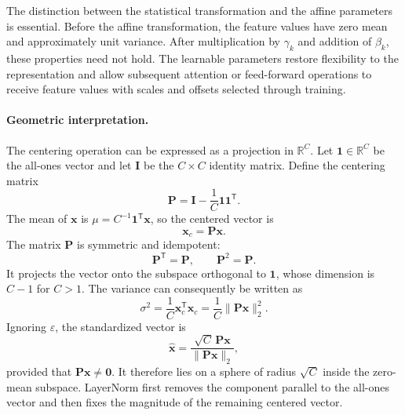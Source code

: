 The distinction between the statistical transformation and the affine
parameters is essential. Before the affine transformation, the feature
values have zero mean and approximately unit variance. After multiplication
by \(\gamma_k\) and addition of \(\beta_k\), these properties need not hold.
The learnable parameters restore flexibility to the representation and allow
subsequent attention or feed-forward operations to receive feature values
with scales and offsets selected through training.

\paragraph{Geometric interpretation.}
The centering operation can be expressed as a projection in
\(\mathbb{R}^{C}\). Let \(\mathbf{1}\in\mathbb{R}^{C}\) be the all-ones
vector and let \(\mathbf{I}\) be the \(C\times C\) identity matrix. Define
the centering matrix
\begin{equation}
    \mathbf{P}
    =
    \mathbf{I}
    -
    \frac{1}{C}\mathbf{1}\mathbf{1}^{\mathsf T}.
    \label{eq:norm-centering-matrix}
\end{equation}
The mean of \(\mathbf{x}\) is
\(\mu=C^{-1}\mathbf{1}^{\mathsf T}\mathbf{x}\), so the centered vector is
\begin{equation}
    \mathbf{x}_{c}
    =
    \mathbf{P}\mathbf{x}.
    \label{eq:norm-projected-vector}
\end{equation}
The matrix \(\mathbf{P}\) is symmetric and idempotent:
\begin{equation}
    \mathbf{P}^{\mathsf T}=\mathbf{P},
    \qquad
    \mathbf{P}^{2}=\mathbf{P}.
    \label{eq:norm-projection-properties}
\end{equation}
It projects the vector onto the subspace orthogonal to \(\mathbf{1}\), whose
dimension is \(C-1\) for \(C>1\). The variance can consequently be written
as
\begin{equation}
    \sigma^2
    =
    \frac{1}{C}\mathbf{x}_{c}^{\mathsf T}\mathbf{x}_{c}
    =
    \frac{1}{C}\|\mathbf{P}\mathbf{x}\|_2^2.
    \label{eq:norm-variance-norm}
\end{equation}
Ignoring \(\varepsilon\), the standardized vector is
\begin{equation}
    \widehat{\mathbf{x}}
    =
    \frac{\sqrt{C}\,\mathbf{P}\mathbf{x}}
    {\|\mathbf{P}\mathbf{x}\|_2},
    \label{eq:norm-ln-geometric}
\end{equation}
provided that \(\mathbf{P}\mathbf{x}\neq\mathbf{0}\). It therefore lies on
a sphere of radius \(\sqrt{C}\) inside the zero-mean subspace. LayerNorm
first removes the component parallel to the all-ones vector and then fixes
the magnitude of the remaining centered vector.

